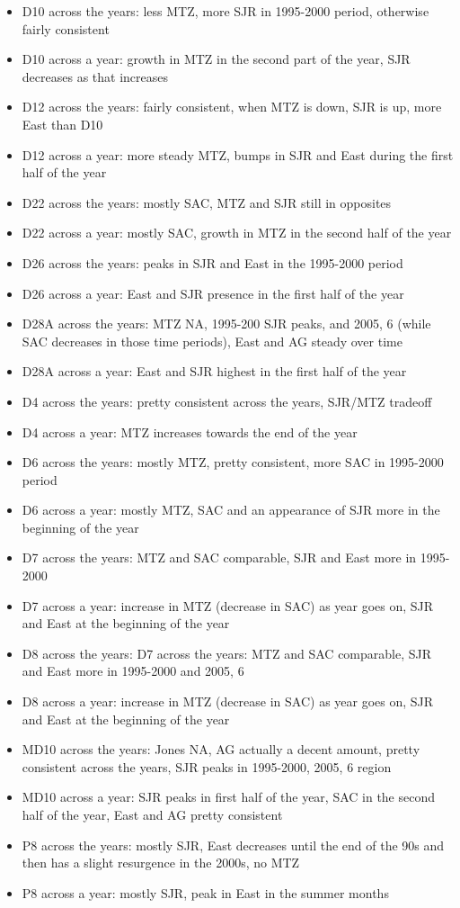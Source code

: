 \documentclass[12pt]{amsart}
\begin{document}
\begin{itemize}
\item D10 across the years: less MTZ, more SJR in 1995-2000 period, otherwise fairly consistent
\item D10 across a year: growth in MTZ in the second part of the year, SJR decreases as that increases
\item D12 across the years: fairly consistent, when MTZ is down, SJR is up, more East than D10
\item D12 across a year: more steady MTZ, bumps in SJR and East during the first half of the year
\item D22 across the years: mostly SAC, MTZ and SJR still in opposites
\item D22 across a year: mostly SAC, growth in MTZ in the second half of the year
\item D26 across the years: peaks in SJR and East in the 1995-2000 period
\item D26 across a year: East and SJR presence in the first half of the year
\item D28A across the years: MTZ NA, 1995-200 SJR peaks, and 2005, 6 (while SAC decreases in those time periods), East and AG steady over time
\item D28A across a year: East and SJR highest in the first half of the year 
\item D4 across the years: pretty consistent across the years, SJR/MTZ tradeoff
\item D4 across a year: MTZ increases towards the end of the year
\item D6 across the years: mostly MTZ, pretty consistent, more SAC in 1995-2000 period
\item D6 across a year: mostly MTZ, SAC and an appearance of SJR more in the beginning of the year
\item D7 across the years: MTZ and SAC comparable, SJR and East more in 1995-2000
\item D7 across a year: increase in MTZ (decrease in SAC) as year goes on, SJR and East at the beginning of the year
\item D8 across the years: D7 across the years: MTZ and SAC comparable, SJR and East more in 1995-2000 and 2005, 6
\item D8 across a year: increase in MTZ (decrease in SAC) as year goes on, SJR and East at the beginning of the year
\item MD10 across the years: Jones NA, AG actually a decent amount, pretty consistent across the years, SJR peaks in 1995-2000, 2005, 6 region
\item MD10 across a year:  SJR peaks in first half of the year, SAC in the second half of the year, East and AG pretty consistent
\item P8 across the years: mostly SJR, East decreases until the end of the 90s and then has a slight resurgence in the 2000s, no MTZ
\item P8 across a year: mostly SJR, peak in East in the summer months
\end{itemize}
\end{document}
